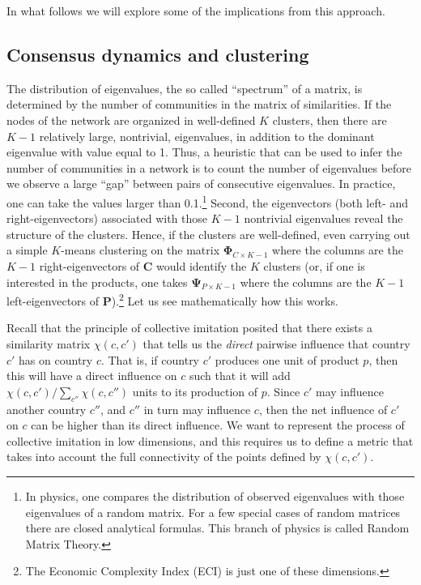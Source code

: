 \documentclass[12pt]{article}
\newcommand{\mtx}[1]{\mathbf{ #1}}
\begin{document}
In what follows we will explore some of the implications from this approach.

\subsection{Consensus dynamics and clustering}
The distribution of eigenvalues, the so called ``spectrum'' of a matrix, is determined by the number of communities in the matrix of similarities. If the nodes of the network are organized in well-defined $K$ clusters, then there are $K-1$ relatively large, nontrivial, eigenvalues, in addition to the dominant eigenvalue with value equal to 1. Thus, a heuristic that can be used to infer the number of communities in a network is to count the number of eigenvalues before we observe a large ``gap'' between pairs of consecutive eigenvalues. In practice, one can take the values larger than 0.1.\footnote{In physics, one compares the distribution of observed eigenvalues with those eigenvalues of a random matrix. For a few special cases of random matrices there are closed analytical formulas. This branch of physics is called Random Matrix Theory.} Second, the eigenvectors (both left- and right-eigenvectors) associated with those $K-1$ nontrivial eigenvalues reveal the structure of the clusters. Hence, if the clusters are well-defined, even carrying out a simple $K$-means clustering on the matrix $\mtx{\Phi}_{C\times K-1}$ where the columns are the $K-1$ right-eigenvectors of $\mtx{C}$  would identify the $K$ clusters (or, if one is interested in the products, one takes $\mtx{\Psi}_{P\times K-1}$ where the columns are the $K-1$ left-eigenvectors of $\mtx{P}$).\footnote{The Economic Complexity Index (ECI) is just one of these dimensions.} Let us see mathematically how this works. 

Recall that the principle of collective imitation posited that there exists a similarity matrix $\chi(c, c')$ that tells us the \emph{direct} pairwise influence that country $c'$ has on country $c$. That is, if country $c'$ produces one unit of product $p$, then this will have a direct influence on $c$ such that it will add $\chi(c, c')/\sum_{c''}\chi(c, c'')$ units to its production of $p$. Since $c'$ may influence another country $c''$, and $c''$ in turn may influence $c$, then the net influence of $c'$ on $c$ can be higher than its direct influence. We want to represent the process of collective imitation in low dimensions, and this requires us to define a metric that takes into account the full connectivity of the points defined by $\chi(c, c')$.
\end{document}
